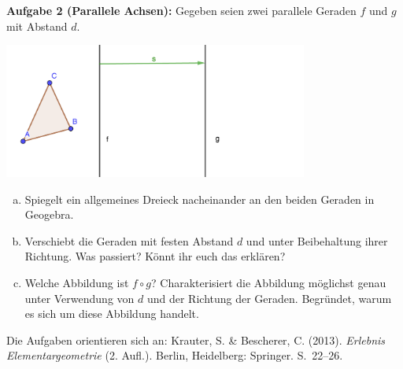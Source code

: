 \documentclass{cssheet}
\begin{document}
\textbf{Aufgabe 2 (Parallele Achsen):}  Gegeben seien zwei parallele Geraden $f$ und $g$ mit Abstand $d$.
\begin{center}
\includegraphics[width=10cm]{zwei-parallele-geraden.png}
\end{center}
\begin{enumerate}[a)]
\item Spiegelt ein allgemeines Dreieck nacheinander an den beiden Geraden in Geogebra. 
\item Verschiebt die Geraden mit festen Abstand $d$ und unter Beibehaltung ihrer Richtung. Was passiert? Könnt ihr euch das erklären?
\item Welche Abbildung ist $f\circ g$? Charakterisiert die Abbildung möglichst genau unter Verwendung von $d$ und der Richtung der Geraden. Begründet, warum es sich um diese Abbildung handelt.
\end{enumerate}

Die Aufgaben orientieren sich an: Krauter, S. \& Bescherer, C. (2013). \emph{Erlebnis Elementargeometrie} (2. Aufl.). Berlin, Heidelberg: Springer. S.~22--26.

\vspace*{10mm}

\printlicense

\printsocials
\end{document}
